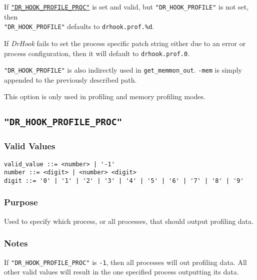 If \hyperref[section:flags:DR_HOOK_PROFILE_PROC]{\texttt{"DR\_HOOK\_PROFILE\_PROC"}} is set and valid, but \texttt{"DR\_HOOK\_PROFILE"} is not set, then \\\texttt{"DR\_HOOK\_PROFILE"} defaults to \verb|drhook.prof.%d|.

If \textit{DrHook} fails to set the process specific patch string either due to an error or process configuration, then it will default to \verb|drhook.prof.0|.

\texttt{"DR\_HOOK\_PROFILE"} is also indirectly used in \texttt{get\_memmon\_out}. \verb|-mem| is simply appended to the previously described path.

This option is only used in profiling and memory profiling modes.



\subsection{\texttt{"DR\_HOOK\_PROFILE\_PROC"}}
\label{section:flags:DR_HOOK_PROFILE_PROC}
\vspace{-2ex}
\subsubsection{Valid Values}
\vspace{-2ex}
\verb+valid_value ::= <number> | '-1'+ \\
\verb+number ::= <digit> | <number> <digit>+ \\
\verb+digit ::= '0' | '1' | '2' | '3' | '4' | '5' | '6' | '7' | '8' | '9'+

\vspace{-2ex}
\subsubsection{Purpose}
\vspace{-2ex}
Used to specify which process, or all processes, that should output profiling data.

\vspace{-2ex}
\subsubsection{Notes}
\vspace{-2ex}
If \texttt{"DR\_HOOK\_PROFILE\_PROC"} is \verb|-1|, then all processes will out profiling data. All other valid values will result in the one specified process outputting its data.

